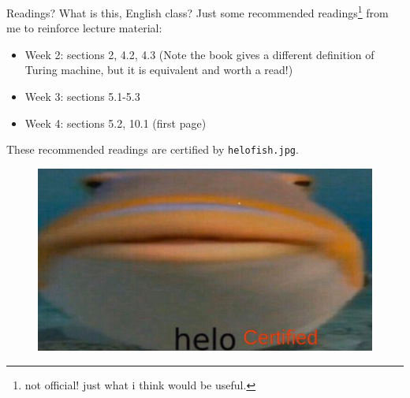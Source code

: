 \documentclass{beamer}
\begin{document}
\begin{frame}{Readings? What is this, English class?}
Just some recommended readings\footnote{not official! just what i think would be useful.} from me to reinforce lecture material:
\begin{itemize}
\item Week 2: sections 2, 4.2, 4.3 (Note the book gives a different definition of Turing machine, but it is equivalent and worth a read!)
\item Week 3: sections 5.1-5.3
\item Week 4: sections 5.2, 10.1 (first page)
\end{itemize}
These recommended readings are certified by \texttt{helo\textunderscore fish.jpg}.
\begin{figure}[h]
\includegraphics[scale=0.3]{img/helo_fish_certified.jpg}
\end{figure}
\end{frame}
\end{document}
